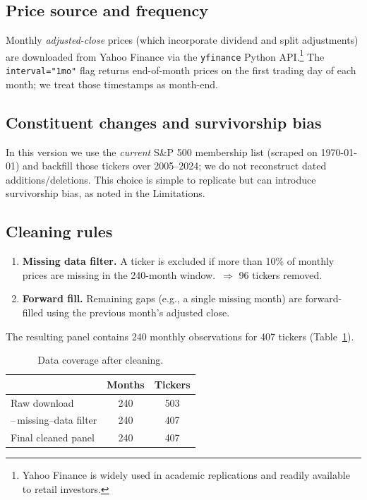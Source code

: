 \documentclass[11pt]{article}
\begin{document}
\subsection{Price source and frequency}
Monthly \emph{adjusted-close} prices (which incorporate dividend and split adjustments) are downloaded from Yahoo Finance via the \texttt{yfinance} Python API.\footnote{Yahoo Finance is widely used in academic replications and readily available to retail investors.}
The \texttt{interval="1mo"} flag returns end-of-month prices on the first trading day of each month; we treat those timestamps as month-end.

\subsection{Constituent changes and survivorship bias}
In this version we use the \emph{current} S\&P 500 membership list (scraped on \today) and backfill those tickers over 2005--2024; we do not reconstruct dated additions/deletions. This choice is simple to replicate but can introduce survivorship bias, as noted in the Limitations.

\subsection{Cleaning rules}
\begin{enumerate}[label=(\alph*), leftmargin=*]
  \item \textbf{Missing data filter.}  A ticker is excluded if more than 10\% of monthly prices are missing in the 240-month window.\ $ \Rightarrow $ 96 tickers removed.  
  \item \textbf{Forward fill.}  Remaining gaps (e.g., a single missing month) are forward-filled using the previous month’s adjusted close.  
\end{enumerate}

The resulting panel contains 240 monthly observations for 407 tickers (Table~\ref{tab:coverage}).

\begin{table}[h!]
  \centering
  \begin{tabular}{lcc}
    \toprule
    & \textbf{Months} & \textbf{Tickers} \\
    \midrule
    Raw download                 & 240 & 503 \\
    \quad--\,missing--data filter & 240 & 407 \\
    Final cleaned panel          & 240 & 407 \\
    \bottomrule
  \end{tabular}
  \caption{Data coverage after cleaning.}
  \label{tab:coverage}
\end{table}
\end{document}
